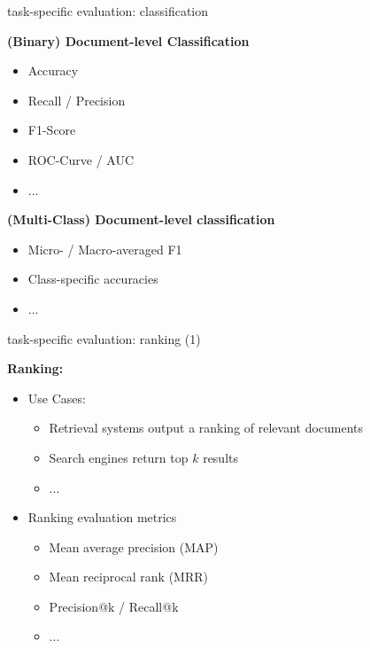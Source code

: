 \begin{frame}{task-specific evaluation: classification}

\vfill

\textbf{(Binary) Document-level Classification}

\begin{itemize}
	\item Accuracy
	\item Recall / Precision
	\item F1-Score
	\item ROC-Curve / AUC
	\item ...
\end{itemize}

\textbf{(Multi-Class) Document-level classification}

\begin{itemize}
	\item Micro- / Macro-averaged F1
	\item Class-specific accuracies
	\item ...
\end{itemize}
\vfill

\end{frame}


\begin{frame}{task-specific evaluation: ranking (1)}

\vfill

\textbf{Ranking:}

\begin{itemize}
		\item Use Cases:
				\begin{itemize}
					\item Retrieval systems output a ranking of relevant documents
					\item Search engines return top $k$ results
					\item ...
				\end{itemize}
		\item Ranking evaluation metrics
				\begin{itemize}
					\item Mean average precision (MAP)
					\item Mean reciprocal rank (MRR)
					\item Precision@k / Recall@k
					\item ...
				\end{itemize}
\end{itemize}
\vfill

\end{frame}

